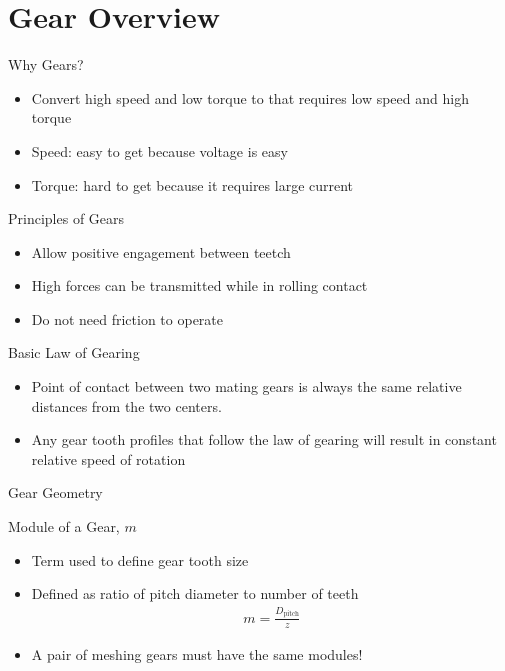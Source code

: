 \documentclass[a4paper,openany]{tufte-book}
\begin{document}
\section{Gear Overview}
\label{sec:org734b406}

Why Gears?

\begin{itemize}
\item Convert high speed and low torque to that requires low speed and high
torque

\item Speed: easy to get because voltage is easy

\item Torque: hard to get because it requires large current
\end{itemize}

Principles of Gears

\begin{itemize}
\item Allow positive engagement between teetch

\item High forces can be transmitted while in rolling contact

\item Do not need friction to operate
\end{itemize}

Basic Law of Gearing

\begin{itemize}
\item Point of contact between two mating gears is always the same relative
distances from the two centers.

\item Any gear tooth profiles that follow the law of gearing will result in
constant relative speed of rotation
\end{itemize}

Gear Geometry

Module of a Gear, \(m\)

\begin{itemize}
\item Term used to define gear tooth size

\item Defined as ratio of pitch diameter to number of teeth
\begin{align}
            m = \frac{D_{\text{pitch}}}{z}
          \end{align}

\item A pair of meshing gears must have the same modules!
\end{itemize}
\end{document}
